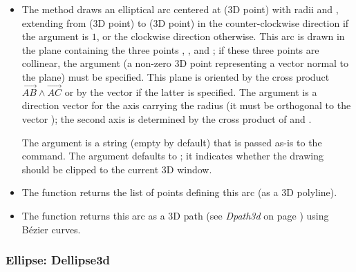 \begin{itemize}
    \item The method  draws an elliptical arc centered at  (3D point) with radii  and , extending from  (3D point) to  (3D point) in the counter-clockwise direction if the argument  is $1$, or the clockwise direction otherwise. This arc is drawn in the plane containing the three points , , and ; if these three points are collinear, the argument  (a non-zero 3D point representing a vector normal to the plane) must be specified. This plane is oriented by the cross product $\vec{AB}\wedge\vec{AC}$ or by the vector  if the latter is specified. The argument  is a direction vector for the axis carrying the radius  (it must be orthogonal to the vector ); the second axis is determined by the cross product of  and . 

    The argument  is a string (empty by default) that is passed as-is to the \drawcmd command. The argument  defaults to \false; it indicates whether the drawing should be clipped to the current 3D window. 

    \item The function  returns the list of points defining this arc (as a 3D polyline). 

    \item The function  returns this arc as a 3D path (see \emph{Dpath3d} on page \pageref{Dpath3d}) using Bézier curves.
\end{itemize}

\subsubsection{Ellipse: Dellipse3d}

